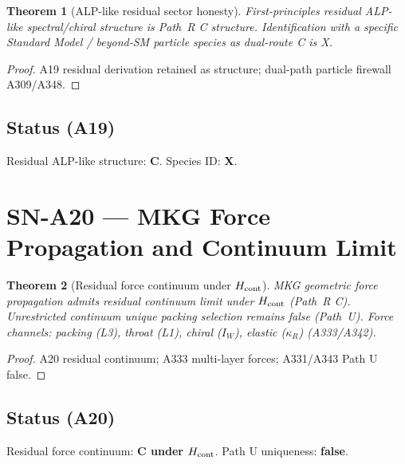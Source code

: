 \documentclass[11pt,a4paper]{article}
\newtheorem{theorem}{Theorem}[section]
\theoremstyle{definition}
\begin{document}
\begin{theorem}[ALP-like residual sector honesty]
\label{thm:A19}
First-principles residual ALP-\emph{like} spectral/chiral structure is Path~R C structure.
Identification with a specific Standard Model / beyond-SM particle species as dual-route C is X.
\end{theorem}

\begin{proof}
A19 residual derivation retained as structure; dual-path particle firewall A309/A348.
\end{proof}

\subsection*{Status (A19)} Residual ALP-like structure: \textbf{C}. Species ID: \textbf{X}.

\section{SN-A20 --- MKG Force Propagation and Continuum Limit}
\label{sec:SNA20}

\begin{theorem}[Residual force continuum under $H_{\rm cont}$]
\label{thm:A20}
MKG geometric force propagation admits residual continuum limit under $H_{\rm cont}$ (Path~R C).
Unrestricted continuum unique packing selection remains false (Path~U).
Force channels: packing (L3), throat (L1), chiral ($I_W$), elastic ($\kappa_R$) (A333/A342).
\end{theorem}

\begin{proof}
A20 residual continuum; A333 multi-layer forces; A331/A343 Path U false.
\end{proof}

\subsection*{Status (A20)} Residual force continuum: \textbf{C under $H_{\rm cont}$}. Path U uniqueness: \textbf{false}.

\end{document}
